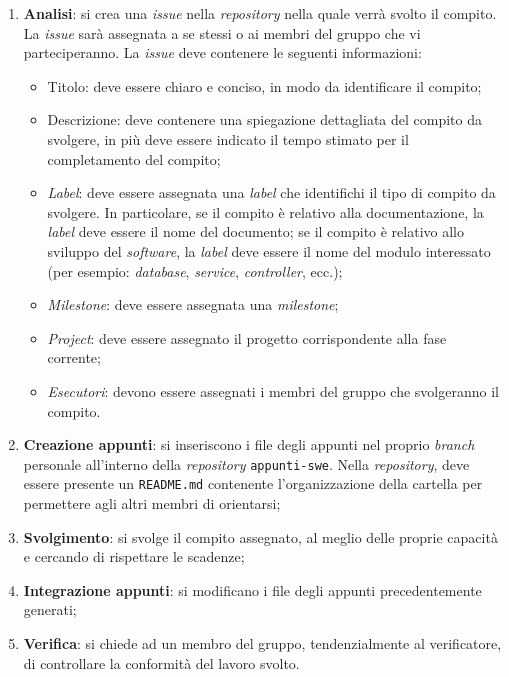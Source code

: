 \begin{enumerate}
	\item \textbf{Analisi}: si crea una \textit{issue\g} nella
	      \textit{repository\g} nella quale verrà svolto il compito. La
	      \textit{issue\g} sarà assegnata a se stessi o ai membri del gruppo che
	      vi parteciperanno. La \textit{issue\g} deve contenere le seguenti
	      informazioni:
	      \begin{itemize}
		      \item Titolo: deve essere chiaro e conciso, in modo da
		            identificare il compito;
		      \item Descrizione: deve contenere una spiegazione dettagliata
		            del compito da svolgere, in più deve essere indicato il
		            tempo stimato per il completamento del compito;
		      \item \textit{Label}: deve essere assegnata una \textit{label}
		            che identifichi il tipo di compito da svolgere. In
		            particolare, se il compito è relativo alla documentazione,
		            la \textit{label} deve essere il nome del documento; se il
		            compito è relativo allo sviluppo del \textit{software},
		            la \textit{label} deve essere il nome del modulo
		            interessato (per esempio: \textit{database},
		            \textit{service}, \textit{controller}, ecc.);
		      \item \textit{Milestone}: deve essere assegnata una
		            \textit{milestone};
		      \item \textit{Project}: deve essere assegnato il progetto
		            corrispondente alla fase corrente;
		      \item \textit{Esecutori}: devono essere assegnati i membri
		            del gruppo che svolgeranno il compito.
	      \end{itemize}
	\item \textbf{Creazione appunti}: si inseriscono i file degli
	      appunti nel proprio \textit{branch} personale all'interno
	      della \textit{repository\g} \texttt{appunti-swe}.
	      Nella \textit{repository\g}, deve essere presente un \texttt{README.md}
	      contenente l'organizzazione della cartella per permettere agli altri
	      membri di orientarsi;
	\item \textbf{Svolgimento}: si svolge il compito assegnato, al meglio
	      delle proprie capacità e cercando di rispettare le scadenze;
	\item \textbf{Integrazione appunti}: si modificano i file degli
	      appunti precedentemente generati;
	\item \textbf{Verifica}: si chiede ad un membro del gruppo,
	      tendenzialmente al verificatore, di controllare la conformità del
	      lavoro svolto.
\end{enumerate}

